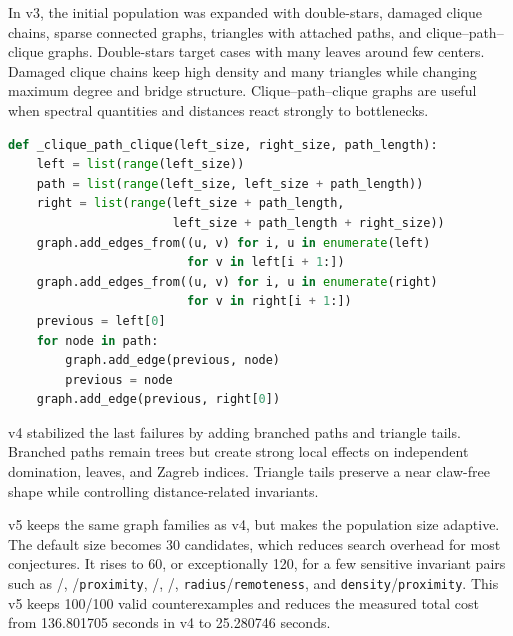 \documentclass[11pt,a4paper]{article}
\begin{document}
In v3, the initial population was expanded with double-stars, damaged clique chains, sparse connected graphs, triangles with attached paths, and clique--path--clique graphs. Double-stars target cases with many leaves around few centers. Damaged clique chains keep high density and many triangles while changing maximum degree and bridge structure. Clique--path--clique graphs are useful when spectral quantities and distances react strongly to bottlenecks.

\begin{lstlisting}[language=Python,caption={Example clique--path--clique seed.}]
def _clique_path_clique(left_size, right_size, path_length):
    left = list(range(left_size))
    path = list(range(left_size, left_size + path_length))
    right = list(range(left_size + path_length,
                       left_size + path_length + right_size))
    graph.add_edges_from((u, v) for i, u in enumerate(left)
                         for v in left[i + 1:])
    graph.add_edges_from((u, v) for i, u in enumerate(right)
                         for v in right[i + 1:])
    previous = left[0]
    for node in path:
        graph.add_edge(previous, node)
        previous = node
    graph.add_edge(previous, right[0])
\end{lstlisting}

v4 stabilized the last failures by adding branched paths and triangle tails. Branched paths remain trees but create strong local effects on independent domination, leaves, and Zagreb indices. Triangle tails preserve a near claw-free shape while controlling distance-related invariants.

v5 keeps the same graph families as v4, but makes the population size adaptive. The default size becomes 30 candidates, which reduces search overhead for most conjectures. It rises to 60, or exceptionally 120, for a few sensitive invariant pairs such as /, /\texttt{proximity}, /, /, \texttt{radius}/\texttt{remoteness}, and \texttt{density}/\texttt{proximity}. This v5 keeps 100/100 valid counterexamples and reduces the measured total cost from 136.801705 seconds in v4 to 25.280746 seconds.
\end{document}
